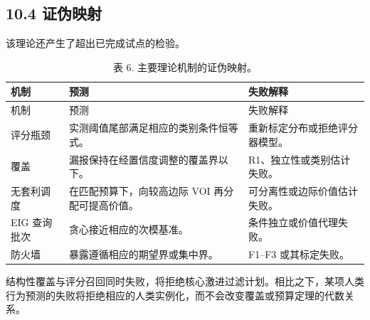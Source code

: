 \documentclass[
  chinese,
  11pt]{article}
\begin{document}
\subsection{10.4 证伪映射}\label{ux8bc1ux4f2aux6620ux5c04}

该理论还产生了超出已完成试点的检验。

\begin{longtable}[]{@{}
  >{\raggedright\arraybackslash}p{}
  >{\raggedright\arraybackslash}p{}
  >{\raggedright\arraybackslash}p{}@{}}
\caption{表 6. 主要理论机制的证伪映射。}\tabularnewline
\toprule\noalign{}
\begin{minipage}[b]{\linewidth}\raggedright
机制
\end{minipage} & \begin{minipage}[b]{\linewidth}\raggedright
预测
\end{minipage} & \begin{minipage}[b]{\linewidth}\raggedright
失败解释
\end{minipage} \\
\midrule\noalign{}
\endfirsthead
\toprule\noalign{}
\begin{minipage}[b]{\linewidth}\raggedright
机制
\end{minipage} & \begin{minipage}[b]{\linewidth}\raggedright
预测
\end{minipage} & \begin{minipage}[b]{\linewidth}\raggedright
失败解释
\end{minipage} \\
\midrule\noalign{}
\endhead
\bottomrule\noalign{}
\endlastfoot
评分瓶颈 & 实测阈值尾部满足相应的类别条件恒等式。 & 重新标定分布或拒绝评分器模型。 \\
覆盖 & 漏报保持在经置信度调整的覆盖界以下。 & R1、独立性或类别估计失败。 \\
无套利调度 & 在匹配预算下，向较高边际 VOI 再分配可提高价值。 & 可分离性或边际价值估计失败。 \\
EIG 查询批次 & 贪心接近相应的次模基准。 & 条件独立或价值代理失败。 \\
防火墙 & 暴露遵循相应的期望界或集中界。 & F1--F3 或其标定失败。 \\
\end{longtable}

结构性覆盖与评分召回同时失败，将拒绝核心激进过滤计划。相比之下，某项人类行为预测的失败将拒绝相应的人类实例化，而不会改变覆盖或预算定理的代数关系。
\end{document}
